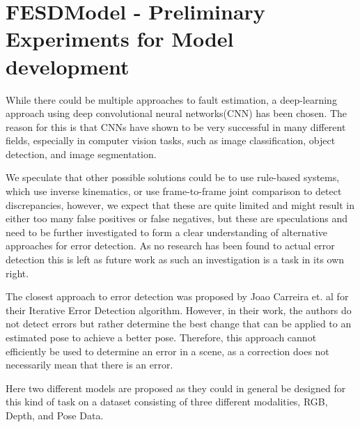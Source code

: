 \chapter[FESDModel]{FESDModel - Preliminary Experiments for Model development}
\label{sec:model_development}

While there could be multiple approaches to fault estimation, a deep-learning approach using deep convolutional neural networks(CNN) has been chosen. The reason for this is that CNNs have shown to be very successful in many different fields, especially in computer vision tasks, such as image classification, object detection, and image segmentation.

We speculate that other possible solutions could be to use rule-based systems, which use inverse kinematics, or use frame-to-frame joint comparison to detect discrepancies, however, we expect that these are quite limited and might result in either too many false positives or false negatives, but these are speculations and need to be further investigated to form a clear understanding of alternative approaches for error detection. As no research has been found to actual error detection this is left as future work as such an investigation is a task in its own right. 

The closest approach to error detection was proposed by Joao Carreira et. al for their Iterative Error Detection algorithm. However, in their work, the authors do not detect errors but rather determine the best change that can be applied to an estimated pose to achieve a better pose. Therefore, this approach cannot efficiently be used to determine an error in a scene, as a correction does not necessarily mean that there is an error.

Here two different models are proposed as they could in general be designed for this kind of task on a dataset consisting of three different modalities, RGB, Depth, and Pose Data.




